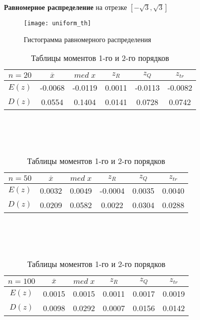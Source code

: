 \documentclass[12pt]{article}
\begin{document}
\newpage
\textbf{Равномерное распределение} на отрезке $[-\sqrt{3}, \sqrt{3}]$
\begin{figure}[h!]
\centering
\texttt{[image: uniform\_th]}
	\caption{Гистограмма равномерного распределения}
	\label{2_pic:1}
\end{figure}

\begin{table}[h!]
	\begin{tabular}{ | c | c | c | c | c | c |}
	\hline
	$n = 20$ & $\overline{x}$ & $med\;x$ & $z_R$ & $z_Q$ & $z_{tr}$ \\ \hline
	$E(z)$ & -0.0068 & -0.0119 & 0.0011 & -0.0113 & -0.0082 \\ \hline
	$D(z)$ & 0.0554 & 0.1404 & 0.0141 & 0.0728 & 0.0742 \\ \hline
	\end{tabular}
	\\
	\\ \\ 
	\begin{tabular}{ | c | c | c | c | c | c |}
	\hline
	$n = 50$ & $\overline{x}$ & $med\;x$ & $z_R$ & $z_Q$ & $z_{tr}$ \\ \hline
	$E(z)$ & 0.0032 & 0.0049 & -0.0004 & 0.0035 & 0.0040 \\ \hline
	$D(z)$ & 0.0209 & 0.0582 & 0.0022 & 0.0304 & 0.0288 \\ \hline
	\end{tabular}
	\\
	\\ \\ 
	\begin{tabular}{ | c | c | c | c | c | c |}
	\hline
	$n = 100$ & $\overline{x}$ & $med\;x$ & $z_R$ & $z_Q$ & $z_{tr}$ \\ \hline
	$E(z)$ & 0.0015 & 0.0015 & 0.0011 & 0.0017 & 0.0019 \\ \hline
	$D(z)$ & 0.0098 & 0.0292 & 0.0007 & 0.0156 & 0.0142 \\ \hline
	\end{tabular}
	\caption*{Таблицы моментов 1-го и 2-го порядков}
\end{table}
\\
\begin{center}
\end{center}
\end{document}
